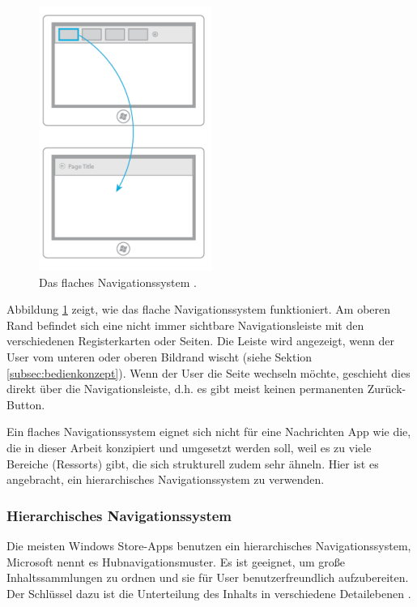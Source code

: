 \documentclass[12pt,a4paper,bibtotoc,abstracton]{scrartcl}
\begin{document}
\begin{figure}[h]	
	\centering
	\includegraphics[scale=1]{Bilder/Abbildungen/ms_navigation_flach.png} 
	\caption[Das flache Navigationssystem]{Das flaches Navigationssystem \protect\citep{MicrosoftNavidesign2013}.}
	\label{fig:naviflach}
\end{figure}

Abbildung \ref{fig:naviflach} zeigt, wie das flache Navigationssystem funktioniert. Am oberen Rand befindet sich eine nicht immer sichtbare Navigationsleiste mit den verschiedenen Registerkarten oder Seiten. Die Leiste wird angezeigt, wenn der User vom unteren oder oberen Bildrand wischt (siehe Sektion \ref{subsec:bedienkonzept}). Wenn der User die Seite wechseln möchte, geschieht dies  direkt über die Navigationsleiste, d.h. es gibt meist keinen permanenten Zurück-Button. 

Ein flaches Navigationssystem eignet sich nicht für eine Nachrichten App wie die, die in dieser Arbeit konzipiert und umgesetzt werden soll, weil es zu viele Bereiche (Ressorts) gibt, die sich strukturell zudem sehr ähneln. Hier ist es angebracht, ein hierarchisches Navigationssystem zu verwenden.    


\subsubsection{Hierarchisches Navigationssystem}
\label{subsubsec:hierachischessystem}
Die meisten Windows Store-Apps benutzen ein hierarchisches Navigationssystem, Microsoft nennt es Hubnavigationsmuster. Es ist geeignet, um große Inhaltssammlungen zu ordnen und sie für User benutzerfreundlich aufzubereiten. Der Schlüssel dazu ist die Unterteilung des Inhalts in verschiedene Detailebenen \citep{MicrosoftNavidesign2013}.
\end{document}
